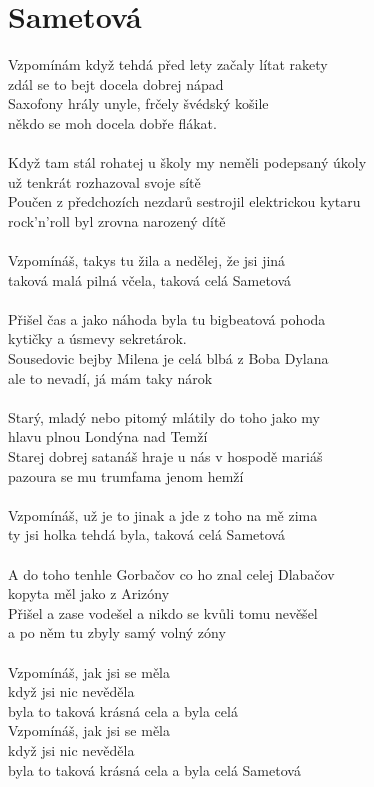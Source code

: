 \section{Sametová}
Vzpomínám když tehdá před lety začaly lítat rakety\\
zdál se to bejt docela dobrej nápad\\
Saxofony hrály unyle, frčely švédský košile\\
někdo se moh docela dobře flákat.\\
\\
Když tam stál rohatej u školy my neměli podepsaný úkoly\\
už tenkrát rozhazoval svoje sítě\\
Poučen z předchozích nezdarů sestrojil elektrickou kytaru\\
rock'n'roll byl zrovna narozený dítě\\
\\
Vzpomínáš, takys tu žila a nedělej, že jsi jiná\\
taková malá pilná včela, taková celá Sametová\\
\\
Přišel čas a jako náhoda byla tu bigbeatová pohoda\\
kytičky a úsmevy sekretárok.\\
Sousedovic bejby Milena je celá blbá z Boba Dylana\\
ale to nevadí, já mám taky nárok\\
\\
Starý, mladý nebo pitomý mlátily do toho jako my\\
hlavu plnou Londýna nad Temží\\
Starej dobrej satanáš hraje u nás v hospodě mariáš\\
pazoura se mu trumfama jenom hemží\\
\\
Vzpomínáš, už je to jinak a jde z toho na mě zima\\
ty jsi holka tehdá byla, taková celá Sametová\\
\\
A do toho tenhle Gorbačov co ho znal celej Dlabačov\\
kopyta měl jako z Arizóny\\
Přišel a zase vodešel a nikdo se kvůli tomu nevěšel\\
a po něm tu zbyly samý volný zóny\\
\\
Vzpomínáš, jak jsi se měla\\
když jsi nic nevěděla\\
byla to taková krásná cela a byla celá\\
Vzpomínáš, jak jsi se měla\\
když jsi nic nevěděla\\
byla to taková krásná cela a byla celá Sametová\\